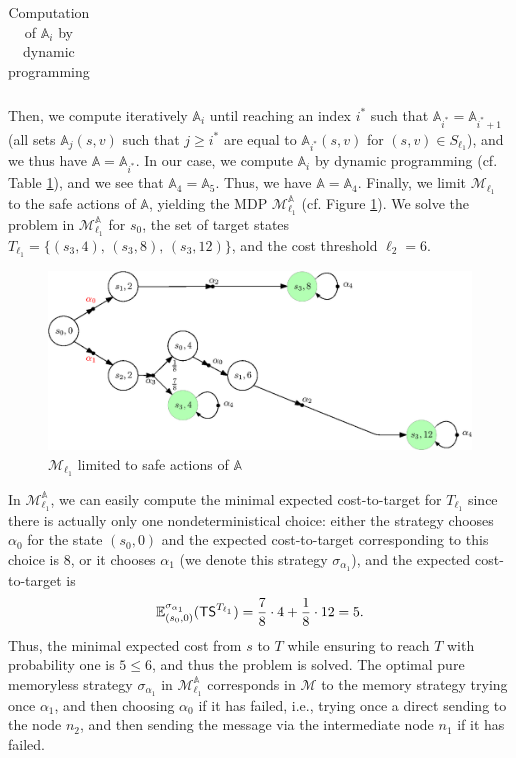 \begin{example}
\begin{table}[h]
\begin{tabular}{l|cccccc}
\end{tabular}
  \caption{Computation of $\mathbb{A}_i$ by dynamic programming}
  \label{my-table2}
\end{table}
Then, we compute iteratively $\mathbb{A}_i$ until reaching an index $i^*$ such that $\mathbb{A}_{i^*} = \mathbb{A}_{i^*+1}$ (all sets $\mathbb{A}_{j}(s, v)$ such that $j \geq i^*$ are equal to $\mathbb{A}_{i^*}(s, v)$ for $(s, v)\in S_{\ell_1}$), and we thus have $\mathbb{A} = \mathbb{A}_{i^*}$.
In our case, we compute $\mathbb{A}_i$ by dynamic programming (cf. Table \ref{my-table2}), and we see that $\mathbb{A}_4=\mathbb{A}_5$. Thus, we have $\mathbb{A} = \mathbb{A}_4$.
Finally, we limit $\mathcal{M}_{\ell_1}$ to the safe actions of $\mathbb{A}$, yielding the MDP $\mathcal{M}_{\ell_1}^\mathbb{A}$ (cf. Figure \ref{safe_actions}).
We solve the \SSPE{} problem in $\mathcal{M}_{\ell_1}^\mathbb{A}$ for $s_0$, the set of target states $T_{\ell_1} = \{(s_3, 4), \, (s_3, 8), \, (s_3, 12)\}$, and the cost threshold $\ell_2 = 6$.
\begin{figure}[h!]
  \centering
  \includegraphics[width=0.8\linewidth]{resources/main-example-unfoldingA}
  \caption{$\mathcal{M}_{\ell_1}$ limited to safe actions of $\mathbb{A}$}
  \label{safe_actions}
\end{figure}
In $\mathcal{M}_{\ell_1}^\mathbb{A}$, we can easily compute the minimal expected cost-to-target for $T_{\ell_1}$ since there is actually only one nondeterministical choice: either the strategy chooses $\alpha_0$ for the state $(s_0, 0)$ and the expected cost-to-target corresponding to this choice is $8$, or it chooses $\alpha_1$ (we denote this strategy $\sigma_{\alpha_1}$), and the expected cost-to-target is
\[
  \mathbb{E}^{\sigma_{\alpha_1}}_{(s_0, 0)}(\text{\sffamily TS}^{T_{\ell_1}}) = \frac{7}{8} \cdot 4 + \frac{1}{8} \cdot 12 = 5.
\]
Thus, the minimal expected cost from $s$ to $T$ while ensuring to reach $T$ with probability one is $5 \leq 6$, and thus the \SSPWE{} problem is solved. The optimal pure memoryless strategy $\sigma_{\alpha_1}$ in $\mathcal{M}_{\ell_1}^\mathbb{A}$ corresponds
in $\mathcal{M}$ to the memory strategy trying once $\alpha_1$, and then choosing $\alpha_0$ if it has failed, i.e., trying once a direct sending to the node $n_2$, and then sending the message via the intermediate node $n_1$ if it has failed.
\end{example}

